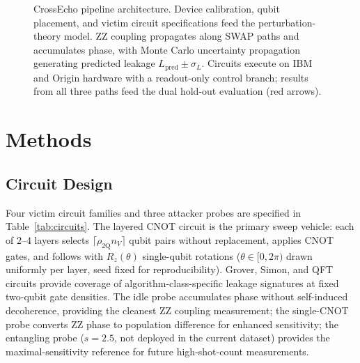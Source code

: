 \documentclass[ASNA,twocolumn]{USG}
\begin{document}
\begin{figure}[t]
\caption{CrossEcho pipeline architecture. Device calibration, qubit placement, and victim circuit specifications feed the perturbation-theory model. ZZ coupling propagates along SWAP paths and accumulates phase, with Monte Carlo uncertainty propagation generating predicted leakage $L_{\mathrm{pred}} \pm \sigma_L$. Circuits execute on IBM and Origin hardware with a readout-only control branch; results from all three paths feed the dual hold-out evaluation (red arrows).}
\label{fig:flowchart}
\end{figure}

\section{Methods}
\label{sec:methods}

\subsection{Circuit Design}

Four victim circuit families and three attacker probes are specified in Table~\ref{tab:circuits}. The layered CNOT circuit is the primary sweep vehicle: each of $2$--$4$ layers selects $\lceil \rho_{\mathrm{2Q}} n_V \rceil$ qubit pairs without replacement, applies CNOT gates, and follows with $R_z(\theta)$ single-qubit rotations ($\theta \in [0, 2\pi)$ drawn uniformly per layer, seed fixed for reproducibility). Grover, Simon, and QFT circuits provide coverage of algorithm-class-specific leakage signatures at fixed two-qubit gate densities. The idle probe accumulates phase without self-induced decoherence, providing the cleanest ZZ coupling measurement; the single-CNOT probe converts ZZ phase to population difference for enhanced sensitivity; the entangling probe ($s=2.5$, not deployed in the current dataset) provides the maximal-sensitivity reference for future high-shot-count measurements.
\end{document}
